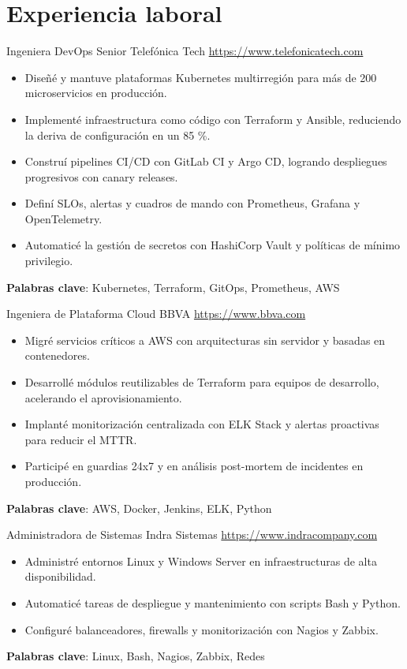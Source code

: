 \documentclass[a4paper, serif, 10pt]{moderncv}
\begin{document}
\section{Experiencia laboral}

        {Ingeniera DevOps Senior}
        {Telefónica Tech}
        {\url{https://www.telefonicatech.com}}
        {}
        {\begin{itemize}
\item Diseñé y mantuve plataformas Kubernetes multirregión para más de 200 microservicios en producción.
\item Implementé infraestructura como código con Terraform y Ansible, reduciendo la deriva de configuración en un 85 \%.
\item Construí pipelines CI/CD con GitLab CI y Argo CD, logrando despliegues progresivos con canary releases.
\item Definí SLOs, alertas y cuadros de mando con Prometheus, Grafana y OpenTelemetry.
\item Automaticé la gestión de secretos con HashiCorp Vault y políticas de mínimo privilegio.
\end{itemize}
\textbf{Palabras clave}: Kubernetes, Terraform, GitOps, Prometheus, AWS}

        {Ingeniera de Plataforma Cloud}
        {BBVA}
        {\url{https://www.bbva.com}}
        {}
        {\begin{itemize}
\item Migré servicios críticos a AWS con arquitecturas sin servidor y basadas en contenedores.
\item Desarrollé módulos reutilizables de Terraform para equipos de desarrollo, acelerando el aprovisionamiento.
\item Implanté monitorización centralizada con ELK Stack y alertas proactivas para reducir el MTTR.
\item Participé en guardias 24x7 y en análisis post-mortem de incidentes en producción.
\end{itemize}
\textbf{Palabras clave}: AWS, Docker, Jenkins, ELK, Python}

        {Administradora de Sistemas}
        {Indra Sistemas}
        {\url{https://www.indracompany.com}}
        {}
        {\begin{itemize}
\item Administré entornos Linux y Windows Server en infraestructuras de alta disponibilidad.
\item Automaticé tareas de despliegue y mantenimiento con scripts Bash y Python.
\item Configuré balanceadores, firewalls y monitorización con Nagios y Zabbix.
\end{itemize}
\textbf{Palabras clave}: Linux, Bash, Nagios, Zabbix, Redes}
\end{document}
